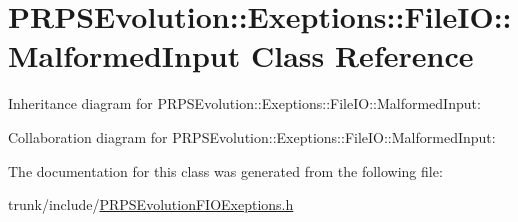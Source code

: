 \hypertarget{class_p_r_p_s_evolution_1_1_exeptions_1_1_file_i_o_1_1_malformed_input}{\section{P\-R\-P\-S\-Evolution\-:\-:Exeptions\-:\-:File\-I\-O\-:\-:Malformed\-Input Class Reference}
\label{class_p_r_p_s_evolution_1_1_exeptions_1_1_file_i_o_1_1_malformed_input}
}


Inheritance diagram for P\-R\-P\-S\-Evolution\-:\-:Exeptions\-:\-:File\-I\-O\-:\-:Malformed\-Input\-:


Collaboration diagram for P\-R\-P\-S\-Evolution\-:\-:Exeptions\-:\-:File\-I\-O\-:\-:Malformed\-Input\-:


The documentation for this class was generated from the following file\-:\begin{DoxyCompactItemize}
\item 
trunk/include/\hyperlink{_p_r_p_s_evolution_f_i_o_exeptions_8h}{P\-R\-P\-S\-Evolution\-F\-I\-O\-Exeptions.\-h}\end{DoxyCompactItemize}
